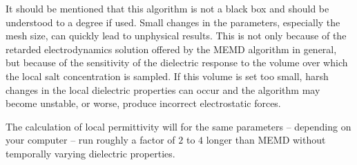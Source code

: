 It should be mentioned that this algorithm is not a black box and should be understood to a degree if used. Small changes in the parameters, especially the mesh size, can quickly lead to unphysical results. This is not only because of the retarded electrodynamics solution offered by the MEMD algorithm in general, but because of the sensitivity of the dielectric response to the volume over which the local salt concentration is sampled. If this volume is set too small, harsh changes in the local dielectric properties can occur and the algorithm may become unstable, or worse, produce incorrect electrostatic forces.

The calculation of local permittivity will for the same parameters -- depending on your computer -- run roughly a factor of $2$ to $4$ longer than MEMD without temporally varying dielectric properties.

